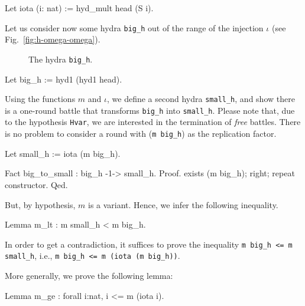\documentclass[a4paper]{book}
\begin{document}
  \begin{Coqsrc}
  Let iota (i: nat) := hyd_mult head (S i).    
  \end{Coqsrc}

Let us consider now some hydra \texttt{big\_h} out of the range of the injection $\iota$ (see Fig.~\vref{fig:h-omega-omega}).

\begin{figure}[htb]
\centering
{}
\caption{\label{fig:h-omega-omega}}
 The hydra \texttt{big\_h}.
\end{figure}

 \begin{Coqsrc}
  Let big_h := hyd1 (hyd1 head).
 \end{Coqsrc}

 Using the functions $m$ and $\iota$, we define a second hydra \texttt{small\_h}, and show
 there is a one-round battle that transforms \texttt{big\_h} into \texttt{small\_h}. Please note that,
due to the hypothesis \texttt{Hvar}, we are interested in the termination of \emph{free} battles. 
There is no problem to consider a round with (\texttt{m big\_h}) as the replication factor.

  \begin{Coqsrc}
 Let small_h := iota (m big_h).
   
 Fact big_to_small : big_h -1-> small_h.
 Proof.
      exists (m big_h); right; repeat constructor.     
 Qed.
    \end{Coqsrc}
 
But, by hypothesis, $m$ is a variant. Hence, we infer the following inequality.


 \begin{Coqsrc}
Lemma m_lt : m small_h < m big_h.
 \end{Coqsrc}

In order to get a contradiction, it suffices to  prove the inequality
\texttt{m big\_h <= m small\_h}, i.e.,  \texttt{m big\_h <= m (iota (m big\_h))}.

More generally, we prove the following lemma: 

\begin{Coqsrc}
Lemma m_ge : forall i:nat, i <= m (iota i).
\end{Coqsrc}
\end{document}
